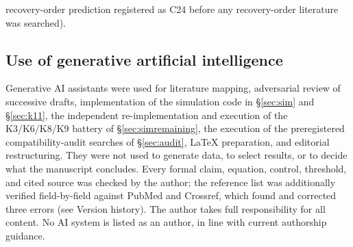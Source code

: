 \documentclass[9pt,twocolumn]{article}
\begin{document}
recovery-order prediction registered as C24 before any recovery-order literature was searched).

\subsection*{Use of generative artificial intelligence}
Generative AI assistants were used for literature mapping, adversarial review of successive drafts, implementation of the simulation code in \S\ref{sec:sim} and \S\ref{sec:k11}, the independent re-implementation and execution of the K3/K6/K8/K9 battery of \S\ref{sec:simremaining}, the execution of the preregistered compatibility-audit searches of \S\ref{sec:audit}, LaTeX preparation, and editorial restructuring. They were not used to generate data, to select results, or to decide what the manuscript concludes. Every formal claim, equation, control, threshold, and cited source was checked by the author; the reference list was additionally verified field-by-field against PubMed and Crossref, which found and corrected three errors (see Version history). The author takes full responsibility for all content. No AI system is listed as an author, in line with current authorship guidance.
\end{document}
